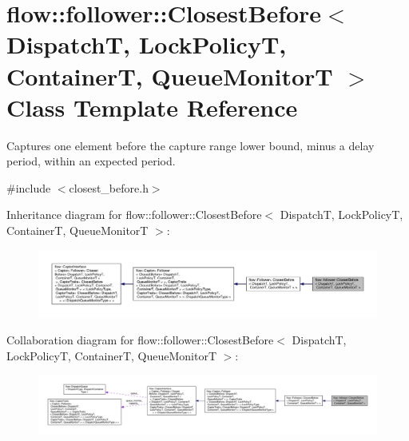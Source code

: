 \hypertarget{classflow_1_1follower_1_1_closest_before}{}\section{flow\+:\+:follower\+:\+:Closest\+Before$<$ DispatchT, Lock\+PolicyT, ContainerT, Queue\+MonitorT $>$ Class Template Reference}
\label{classflow_1_1follower_1_1_closest_before}


Captures one element before the capture range lower bound, minus a delay period, within an expected period.  




{\ttfamily \#include $<$closest\+\_\+before.\+h$>$}



Inheritance diagram for flow\+:\+:follower\+:\+:Closest\+Before$<$ DispatchT, Lock\+PolicyT, ContainerT, Queue\+MonitorT $>$\+:
\nopagebreak
\begin{figure}[H]
\begin{center}
\leavevmode
\includegraphics[width=350pt]{classflow_1_1follower_1_1_closest_before__inherit__graph}
\end{center}
\end{figure}


Collaboration diagram for flow\+:\+:follower\+:\+:Closest\+Before$<$ DispatchT, Lock\+PolicyT, ContainerT, Queue\+MonitorT $>$\+:
\nopagebreak
\begin{figure}[H]
\begin{center}
\leavevmode
\includegraphics[width=350pt]{classflow_1_1follower_1_1_closest_before__coll__graph}
\end{center}
\end{figure}
